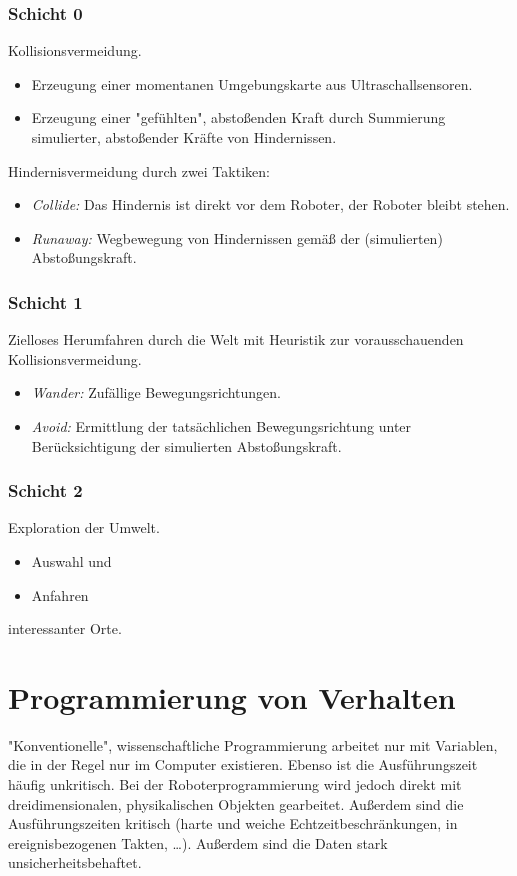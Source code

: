 			\subsubsection{Schicht 0}
				Kollisionsvermeidung.

				\begin{itemize}
					\item Erzeugung einer momentanen Umgebungskarte aus Ultraschallsensoren.
					\item Erzeugung einer "gefühlten", abstoßenden Kraft durch Summierung simulierter, abstoßender Kräfte von Hindernissen.
				\end{itemize}

				Hindernisvermeidung durch zwei Taktiken:
				\begin{itemize}
					\item \emph{Collide:} Das Hindernis ist direkt vor dem Roboter, der Roboter bleibt stehen.
					\item \emph{Runaway:} Wegbewegung von Hindernissen gemäß der (simulierten) Abstoßungskraft.
				\end{itemize}

			\subsubsection{Schicht 1}
				Zielloses Herumfahren durch die Welt mit Heuristik zur vorausschauenden Kollisionsvermeidung.

				\begin{itemize}
					\item \emph{Wander:} Zufällige Bewegungsrichtungen.
					\item \emph{Avoid:} Ermittlung der tatsächlichen Bewegungsrichtung unter Berücksichtigung der simulierten Abstoßungskraft.
				\end{itemize}

			\subsubsection{Schicht 2}
				Exploration der Umwelt.

				\begin{itemize}
					\item Auswahl und
					\item Anfahren
				\end{itemize}
				interessanter Orte.

	\section{Programmierung von Verhalten}
		"Konventionelle", wissenschaftliche Programmierung arbeitet nur mit Variablen, die in der Regel nur im Computer existieren. Ebenso ist die Ausführungszeit häufig unkritisch. Bei der Roboterprogrammierung wird jedoch direkt mit dreidimensionalen, physikalischen Objekten gearbeitet. Außerdem sind die Ausführungszeiten kritisch (harte und weiche Echtzeitbeschränkungen, in ereignisbezogenen Takten, \dots). Außerdem sind die Daten \iA stark unsicherheitsbehaftet.

